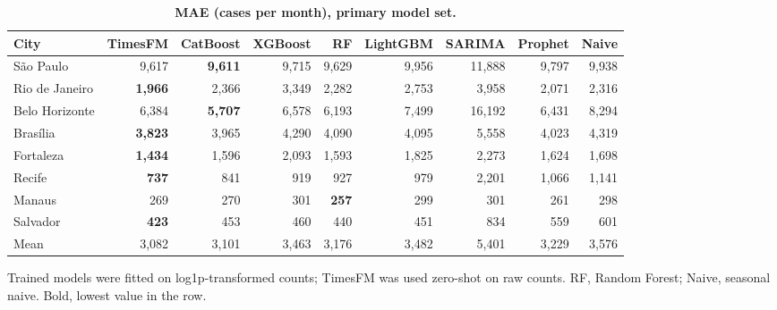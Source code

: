 \documentclass[10pt,letterpaper]{article}
\begin{document}

\begin{table}[!ht]
\centering
\small
\caption{\textbf{MAE (cases per month), primary model set.}}
\begin{tabular}{lrrrrrrrr}
\toprule
City & TimesFM & CatBoost & XGBoost & RF & LightGBM & SARIMA & Prophet & Naive \\
\midrule
S\~ao Paulo & 9{,}617 & \textbf{9{,}611} & 9{,}715 & 9{,}629 & 9{,}956 & 11{,}888 & 9{,}797 & 9{,}938 \\
Rio de Janeiro & \textbf{1{,}966} & 2{,}366 & 3{,}349 & 2{,}282 & 2{,}753 & 3{,}958 & 2{,}071 & 2{,}316 \\
Belo Horizonte & 6{,}384 & \textbf{5{,}707} & 6{,}578 & 6{,}193 & 7{,}499 & 16{,}192 & 6{,}431 & 8{,}294 \\
Bras\'ilia & \textbf{3{,}823} & 3{,}965 & 4{,}290 & 4{,}090 & 4{,}095 & 5{,}558 & 4{,}023 & 4{,}319 \\
Fortaleza & \textbf{1{,}434} & 1{,}596 & 2{,}093 & 1{,}593 & 1{,}825 & 2{,}273 & 1{,}624 & 1{,}698 \\
Recife & \textbf{737} & 841 & 919 & 927 & 979 & 2{,}201 & 1{,}066 & 1{,}141 \\
Manaus & 269 & 270 & 301 & \textbf{257} & 299 & 301 & 261 & 298 \\
Salvador & \textbf{423} & 453 & 460 & 440 & 451 & 834 & 559 & 601 \\
\midrule
Mean & 3{,}082 & 3{,}101 & 3{,}463 & 3{,}176 & 3{,}482 & 5{,}401 & 3{,}229 & 3{,}576 \\
\bottomrule
\end{tabular}
\begin{flushleft} Trained models were fitted on log1p-transformed counts; TimesFM was used zero-shot on raw counts. RF, Random Forest; Naive, seasonal naive. Bold, lowest value in the row.
\end{flushleft}
\label{tabB}
\end{table}


\end{document}
